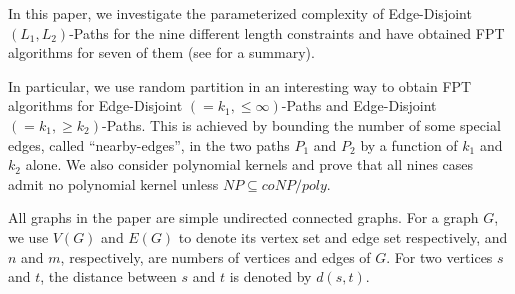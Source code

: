 \documentclass{llncs}
\begin{document}
In this paper, we investigate the parameterized complexity of {\sc Edge-Disjoint $(L_1,L_2)$-Paths}
for the nine different length constraints and have obtained FPT algorithms for seven of them 
(see  for a summary).

In particular, we use random partition in an interesting way to obtain FPT algorithms for
{\sc Edge-Disjoint $(= k_1, \le \infty)$-Paths} and {\sc Edge-Disjoint $(= k_1, \ge k_2)$-Paths}.
This is achieved by bounding the number of some special edges, called ``nearby-edges'',
in the two paths $P_1$ and $P_2$ by a function of $k_1$ and $k_2$ alone.
We also consider polynomial kernels and prove that all nines cases admit no polynomial kernel 
unless $NP \subseteq coNP/poly$. \\


 All graphs in the paper are simple undirected connected graphs. 
For a graph $G$, we use $V(G)$ and $E(G)$ to denote 
its vertex set and edge set respectively,
and $n$ and $m$, respectively, are numbers of vertices and edges of $G$. 
For two vertices $s$ and $t$, the distance between $s$ and $t$ is denoted by $d(s, t)$. 
\end{document}
